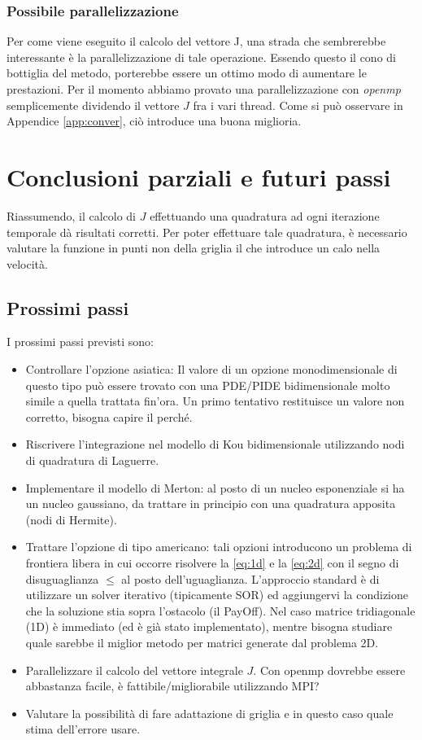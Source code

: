 \documentclass[a4paper,10pt]{article}
\begin{document}
\subsubsection{Possibile parallelizzazione}
Per come viene eseguito il calcolo del vettore J, una strada che sembrerebbe interessante è la parallelizzazione di tale operazione. Essendo questo il cono di bottiglia del metodo, porterebbe essere un ottimo modo di aumentare le prestazioni. Per il momento abbiamo provato una parallelizzazione con \emph{openmp} semplicemente dividendo il vettore $J$ fra i vari thread. Come si può osservare in Appendice \ref{app:conver}, ciò introduce una buona miglioria.

\section{Conclusioni parziali e futuri passi}

Riassumendo, il calcolo di $J$ effettuando una quadratura ad ogni iterazione temporale d\`a risultati corretti. Per poter effettuare tale quadratura, è necessario valutare la funzione in punti non della griglia il che introduce un calo nella velocità.

\subsection{Prossimi passi}
I prossimi passi previsti sono:
\begin{itemize}
 \item Controllare l'opzione asiatica: Il valore di un opzione monodimensionale di questo tipo può essere trovato con una PDE/PIDE bidimensionale molto simile a quella trattata fin'ora. Un primo tentativo restituisce un valore non corretto, bisogna capire il perché.
 \item Riscrivere l'integrazione nel modello di Kou bidimensionale utilizzando nodi di quadratura di Laguerre.
 \item Implementare il modello di Merton: al posto di un nucleo esponenziale si ha un nucleo gaussiano, da trattare in principio con una quadratura apposita (nodi di Hermite).
 \item Trattare l'opzione di tipo americano: tali opzioni introducono un problema di frontiera libera in cui occorre risolvere la \eqref{eq:1d} e la \eqref{eq:2d} con il segno di disuguaglianza $\leq$ al posto dell'uguaglianza. L'approccio standard è di utilizzare un solver iterativo (tipicamente SOR) ed aggiungervi la condizione che la soluzione stia sopra l'ostacolo (il PayOff). Nel caso matrice tridiagonale (1D) è immediato (ed \`e gi\`a stato implementato), mentre bisogna studiare quale sarebbe il miglior metodo per matrici generate dal problema 2D.
 \item Parallelizzare il calcolo del vettore integrale $J$. Con openmp dovrebbe essere abbastanza facile, è fattibile/migliorabile utilizzando MPI?
 \item Valutare la possibilità di fare adattazione di griglia e in questo caso quale stima dell'errore usare.
\end{itemize}
\end{document}
